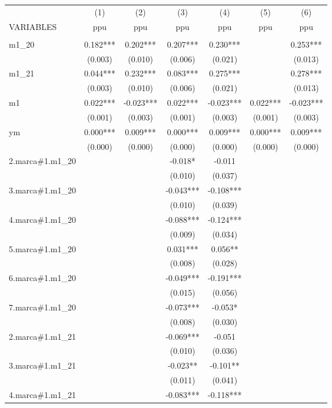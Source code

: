 \begin{tabular}{lcccccc} \hline
 & (1) & (2) & (3) & (4) & (5) & (6) \\
VARIABLES & ppu & ppu & ppu & ppu & ppu & ppu \\ \hline
 &  &  &  &  &  &  \\
m1\_20 & 0.182*** & 0.202*** & 0.207*** & 0.230*** &  & 0.253*** \\
 & (0.003) & (0.010) & (0.006) & (0.021) &  & (0.013) \\
m1\_21 & 0.044*** & 0.232*** & 0.083*** & 0.275*** &  & 0.278*** \\
 & (0.003) & (0.010) & (0.006) & (0.021) &  & (0.013) \\
m1 & 0.022*** & -0.023*** & 0.022*** & -0.023*** & 0.022*** & -0.023*** \\
 & (0.001) & (0.003) & (0.001) & (0.003) & (0.001) & (0.003) \\
ym & 0.000*** & 0.009*** & 0.000*** & 0.009*** & 0.000*** & 0.009*** \\
 & (0.000) & (0.000) & (0.000) & (0.000) & (0.000) & (0.000) \\
2.marca\#1.m1\_20 &  &  & -0.018* & -0.011 &  &  \\
 &  &  & (0.010) & (0.037) &  &  \\
3.marca\#1.m1\_20 &  &  & -0.043*** & -0.108*** &  &  \\
 &  &  & (0.010) & (0.039) &  &  \\
4.marca\#1.m1\_20 &  &  & -0.088*** & -0.124*** &  &  \\
 &  &  & (0.009) & (0.034) &  &  \\
5.marca\#1.m1\_20 &  &  & 0.031*** & 0.056** &  &  \\
 &  &  & (0.008) & (0.028) &  &  \\
6.marca\#1.m1\_20 &  &  & -0.049*** & -0.191*** &  &  \\
 &  &  & (0.015) & (0.056) &  &  \\
7.marca\#1.m1\_20 &  &  & -0.073*** & -0.053* &  &  \\
 &  &  & (0.008) & (0.030) &  &  \\
2.marca\#1.m1\_21 &  &  & -0.069*** & -0.051 &  &  \\
 &  &  & (0.010) & (0.036) &  &  \\
3.marca\#1.m1\_21 &  &  & -0.023** & -0.101** &  &  \\
 &  &  & (0.011) & (0.041) &  &  \\
4.marca\#1.m1\_21 &  &  & -0.083*** & -0.118*** &  &  \\

\end{tabular}
